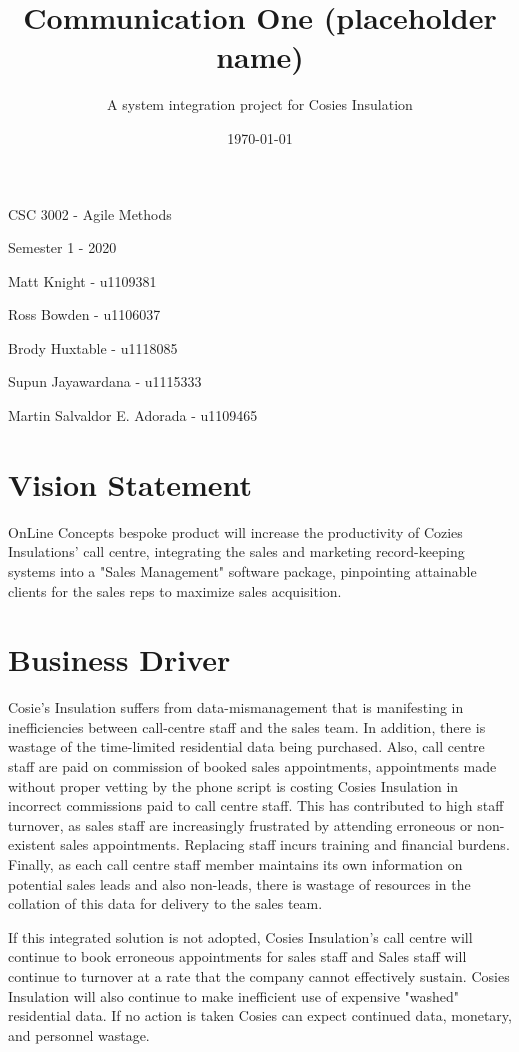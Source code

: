 \documentclass[11pt]{article} %
\title{Communication One (placeholder name)}
\author{A system integration project for Cosies Insulation}
\date{\today}
\begin{document}
\maketitle
\begin{center}
CSC 3002 - Agile Methods

Semester 1 - 2020

Matt Knight - u1109381

Ross Bowden - u1106037

Brody Huxtable - u1118085

Supun Jayawardana - u1115333

Martin Salvaldor E. Adorada - u1109465
\end{center}
\newpage

\tableofcontents       
\newpage


\section{Vision Statement}
\begin{center}
OnLine Concepts bespoke product will increase the productivity of Cozies Insulations' call centre, integrating the sales and marketing record-keeping systems into a "Sales Management"
software package, pinpointing attainable clients for the sales reps to maximize sales acquisition.
\end{center}

\section{Business Driver}
\begin{flushleft}
Cosie's Insulation suffers from data-mismanagement that is manifesting in inefficiencies between call-centre staff and the sales team. In addition, there is wastage of the time-limited residential data being purchased. Also, call centre staff are paid on commission of booked sales appointments, appointments made without proper vetting by the phone script is costing Cosies Insulation in incorrect commissions paid to call centre staff. This has contributed to high staff turnover, as sales staff are increasingly frustrated by attending erroneous or non-existent sales appointments. Replacing staff incurs training and financial burdens. Finally, as each call centre staff member maintains its own information on potential sales leads and also non-leads, there is wastage of resources in the collation of this data for delivery to the sales team.

If this integrated solution is not adopted, Cosies Insulation's call centre will continue to book erroneous appointments for sales staff and Sales staff will continue to turnover at a rate that the company cannot effectively sustain. Cosies Insulation will also continue to make inefficient use of expensive "washed" residential data. If no action is taken Cosies can expect continued data, monetary, and personnel wastage.

\end{flushleft}
\end{document}
